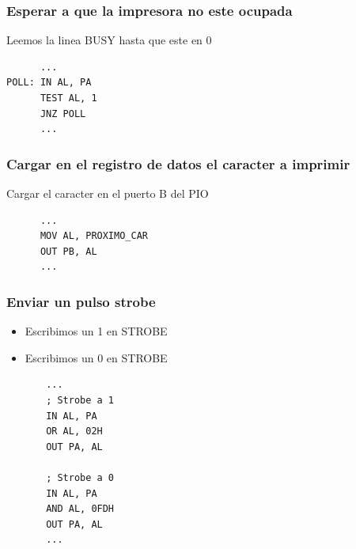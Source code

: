 \documentclass{beamer}
\begin{document}
\begin{frame}[fragile]
\frametitle{Esperar a que la impresora no este ocupada}
Leemos la linea BUSY hasta que este en 0
\begin{block}{}
\begin{verbatim}
      ...
POLL: IN AL, PA
      TEST AL, 1
      JNZ POLL
      ...
\end{verbatim}
\end{block}
\end{frame}

\begin{frame}[fragile]
\frametitle{Cargar en el registro de datos el caracter a imprimir}
Cargar el caracter en el puerto B del PIO
\begin{block}{}
\begin{verbatim}
      ...
      MOV AL, PROXIMO_CAR
      OUT PB, AL
      ...
\end{verbatim}
\end{block}
\end{frame}

\begin{frame}[fragile]
\frametitle{Enviar un pulso strobe}
\begin{itemize}
    \item Escribimos un 1 en STROBE
    \item Escribimos un 0 en STROBE
\end{itemize}
\begin{block}{}
\begin{verbatim}
       ...
       ; Strobe a 1
       IN AL, PA
       OR AL, 02H
       OUT PA, AL

       ; Strobe a 0
       IN AL, PA
       AND AL, 0FDH
       OUT PA, AL           
       ...
\end{verbatim}
\end{block}

\end{frame}
\end{document}

